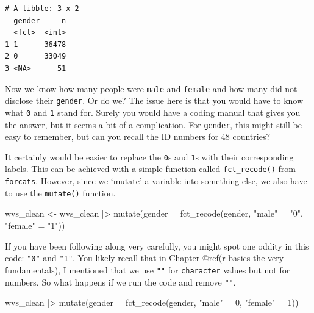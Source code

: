 \documentclass[
  letterpaper,
]{krantz}
\makeatletter
\newenvironment{Shaded}{\begin{snugshade}}{\end{snugshade}}
\newcommand{\AttributeTok}[1]{\textcolor[rgb]{0.40,0.45,0.13}{#1}}
\newcommand{\DecValTok}[1]{\textcolor[rgb]{0.68,0.00,0.00}{#1}}
\newcommand{\FunctionTok}[1]{\textcolor[rgb]{0.28,0.35,0.67}{#1}}
\newcommand{\NormalTok}[1]{\textcolor[rgb]{0.00,0.23,0.31}{#1}}
\newcommand{\OtherTok}[1]{\textcolor[rgb]{0.00,0.23,0.31}{#1}}
\newcommand{\SpecialCharTok}[1]{\textcolor[rgb]{0.37,0.37,0.37}{#1}}
\newcommand{\StringTok}[1]{\textcolor[rgb]{0.13,0.47,0.30}{#1}}
\newenvironment{kframe}{%
\medskip{}
\setlength{\fboxsep}{.8em}
 \def\at@end@of@kframe{}%
 \ifinner\ifhmode%
  \def\at@end@of@kframe{\end{minipage}}%
  \begin{minipage}{\columnwidth}%
 \fi\fi%
 \def\FrameCommand##1{\hskip\@totalleftmargin \hskip-\fboxsep
 \colorbox{shadecolor}{##1}\hskip-\fboxsep
     \hskip-\linewidth \hskip-\@totalleftmargin \hskip\columnwidth}%
 \MakeFramed {\advance\hsize-\width
   \@totalleftmargin\z@ \linewidth\hsize
   \@setminipage}}%
 {\par\unskip\endMakeFramed%
 \at@end@of@kframe}
\renewenvironment{Shaded}{\begin{kframe}}{\end{kframe}}
\makeatother
\begin{document}
\begin{verbatim}
# A tibble: 3 x 2
  gender     n
  <fct>  <int>
1 1      36478
2 0      33049
3 <NA>      51
\end{verbatim}

Now we know how many people were \texttt{male} and \texttt{female} and
how many did not disclose their \texttt{gender}. Or do we? The issue
here is that you would have to know what \texttt{0} and \texttt{1} stand
for. Surely you would have a coding manual that gives you the answer,
but it seems a bit of a complication. For \texttt{gender}, this might
still be easy to remember, but can you recall the ID numbers for 48
countries?

It certainly would be easier to replace the \texttt{0}s and \texttt{1}s
with their corresponding labels. This can be achieved with a simple
function called \texttt{fct\_recode()} from \texttt{forcats}. However,
since we `mutate' a variable into something else, we also have to use
the \texttt{mutate()} function.

\begin{Shaded}
\begin{Highlighting}[]
\NormalTok{wvs\_clean }\OtherTok{\textless{}{-}}
\NormalTok{  wvs\_clean }\SpecialCharTok{|\textgreater{}}
  \FunctionTok{mutate}\NormalTok{(}\AttributeTok{gender =} \FunctionTok{fct\_recode}\NormalTok{(gender,}
                             \StringTok{"male"} \OtherTok{=} \StringTok{"0"}\NormalTok{,}
                             \StringTok{"female"} \OtherTok{=} \StringTok{"1"}\NormalTok{))}
\end{Highlighting}
\end{Shaded}

If you have been following along very carefully, you might spot one
oddity in this code: \texttt{"0"} and \texttt{"1"}. You likely recall
that in Chapter @ref(r-basics-the-very-fundamentals), I mentioned that
we use \texttt{""} for \texttt{character} values but not for numbers. So
what happens if we run the code and remove \texttt{""}.

\begin{Shaded}
\begin{Highlighting}[]
\NormalTok{wvs\_clean }\SpecialCharTok{|\textgreater{}}
  \FunctionTok{mutate}\NormalTok{(}\AttributeTok{gender =} \FunctionTok{fct\_recode}\NormalTok{(gender,}
                             \StringTok{"male"} \OtherTok{=} \DecValTok{0}\NormalTok{,}
                             \StringTok{"female"} \OtherTok{=} \DecValTok{1}\NormalTok{))}
\end{Highlighting}
\end{Shaded}
\end{document}
